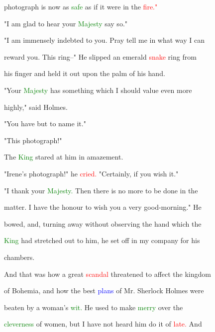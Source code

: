  photograph is now as \textcolor{green}{safe} as if it were in the \textcolor{red}{fire."}



 "I am \textcolor{BurntOrange}{glad} to hear your \textcolor{green}{Majesty} say so."



 "I am immensely indebted to you. \textcolor{BurntOrange}{Pray} tell me in what way I can

 \textcolor{BurntOrange}{reward} you. This ring--" He \textcolor{BurntOrange}{slipped} an emerald \textcolor{red}{snake} ring from

 his finger and held it out upon the palm of his hand.



 "Your \textcolor{green}{Majesty} has something which I should value even more

 highly," said Holmes.



 "You have but to name it."



 "This photograph!"



 The \textcolor{green}{King} \textcolor{BurntOrange}{stared} at him in amazement.



 "Irene's photograph!" he \textcolor{red}{cried.} "Certainly, if you wish it."



 "I thank your \textcolor{green}{Majesty.} Then there is no more to be done in the

 matter. I have the honour to wish you a very good-morning." He

 bowed, and, turning away without observing the hand which the

 \textcolor{green}{King} had stretched out to him, he set off in my company for his

 chambers.



 And that was how a great \textcolor{red}{scandal} \textcolor{BurntOrange}{threatened} to affect the kingdom

 of Bohemia, and how the best \textcolor{blue}{plans} of Mr. Sherlock Holmes were

 beaten by a woman's \textcolor{green}{wit.} He used to make \textcolor{green}{merry} over the

 \textcolor{green}{cleverness} of women, but I have not heard him do it of \textcolor{red}{late.} And

